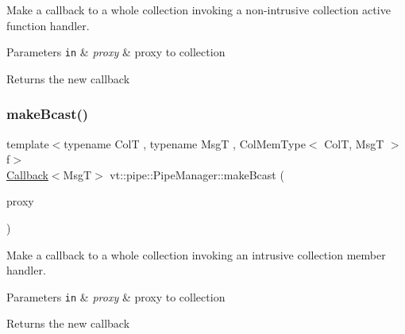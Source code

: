 Make a callback to a whole collection invoking a non-\/intrusive collection active function handler. 


\begin{DoxyParams}[1]{Parameters}
\mbox{\tt in}  & {\em proxy} & proxy to collection\\
\hline
\end{DoxyParams}
\begin{DoxyReturn}{Returns}
the new callback 
\end{DoxyReturn}
\mbox{\label{structvt_1_1pipe_1_1_pipe_manager_a6fb7d87f8beb2c1e80d492df47036158}} 
\subsubsection{\texorpdfstring{make\+Bcast()}{makeBcast()}\hspace{0.1cm}{\footnotesize\ttfamily [5/6]}}
{\footnotesize\ttfamily template$<$typename ColT , typename MsgT , Col\+Mem\+Type$<$ Col\+T, Msg\+T $>$ f$>$ \\
\hyperlink{namespacevt_a36db99df4c973d48b1118a293fff533f}{Callback}$<$MsgT$>$ vt\+::pipe\+::\+Pipe\+Manager\+::make\+Bcast (\begin{DoxyParamCaption}\item[{\hyperlink{structvt_1_1pipe_1_1_pipe_manager_t_l_af56c58cad882496e35f01227d4da3898}{Col\+Proxy\+Type}$<$ ColT $>$}]{proxy }\end{DoxyParamCaption})}



Make a callback to a whole collection invoking an intrusive collection member handler. 


\begin{DoxyParams}[1]{Parameters}
\mbox{\tt in}  & {\em proxy} & proxy to collection\\
\hline
\end{DoxyParams}
\begin{DoxyReturn}{Returns}
the new callback 
\end{DoxyReturn}
\mbox{\label{structvt_1_1pipe_1_1_pipe_manager_a4d561c17ce6861401a32892223e434c9}} 
